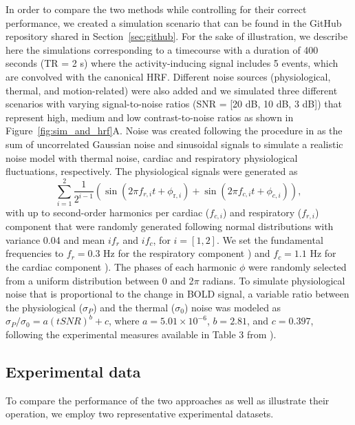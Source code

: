 In order to compare the two methods while controlling for their correct
performance, we created a simulation scenario that can be found in the GitHub
repository shared in Section~\ref{sec:github}. For the sake of illustration, we
describe here the simulations corresponding to a timecourse with a duration of
400 seconds (TR = 2 s) where the activity-inducing signal includes 5 events,
which are convolved with the canonical HRF. Different noise sources
(physiological, thermal, and motion-related) were also added and we simulated
three different scenarios with varying signal-to-noise ratios (SNR = [20 dB, 10
dB, 3 dB]) that represent high, medium and low contrast-to-noise ratios as shown
in Figure~\ref{fig:sim_and_hrf}A. Noise was created following the procedure in
\citep{Gaudes2013Paradigmfreemapping} as the sum of uncorrelated Gaussian noise
and sinusoidal signals to simulate a realistic noise model with thermal noise,
cardiac and respiratory physiological fluctuations, respectively. The
physiological signals were generated as
\begin{equation}
    \sum_{i=1}^{2} \frac{1}{2^{i-1}}\left(\sin \left(2 \pi f_{r, i} t+\phi_{\mathrm{r}, i}\right)+\sin \left(2 \pi f_{c, i} t+\phi_{c, i}\right)\right),
\end{equation}
with up to second-order harmonics per cardiac (\(f_{c,i}\)) and respiratory
(\(f_{r,i}\)) component that were randomly generated following normal
distributions with variance 0.04 and mean \(if_r\) and \(if_c\), for \(i = [1,
2]\). We set the fundamental frequencies to \(f_r = 0.3\) Hz for the respiratory
component \citep{Birn2006Separatingrespiratoryvariation}) and \(f_c = 1.1\) Hz
for the cardiac component \citep{Shmueli2007Lowfrequencyfluctuations}). The
phases of each harmonic \(\phi\) were randomly selected from a uniform
distribution between 0 and 2$\pi$ radians. To simulate physiological noise that
is proportional to the change in BOLD signal, a variable ratio between the
physiological (\(\sigma_P\)) and the thermal (\(\sigma_0\)) noise was modeled as
\(\sigma_P/\sigma_0 = a(tSNR)^b + c\), where \(a = 5.01 \times 10^{-6}\), \(b =
2.81\), and \(c = 0.397\), following the experimental measures available in
Table 3 from \citep{Triantafyllou2005Comparisonphysiologicalnoise}).

\subsection{Experimental data}
To compare the performance of the two approaches as well as illustrate their
operation, we employ two representative experimental datasets.

